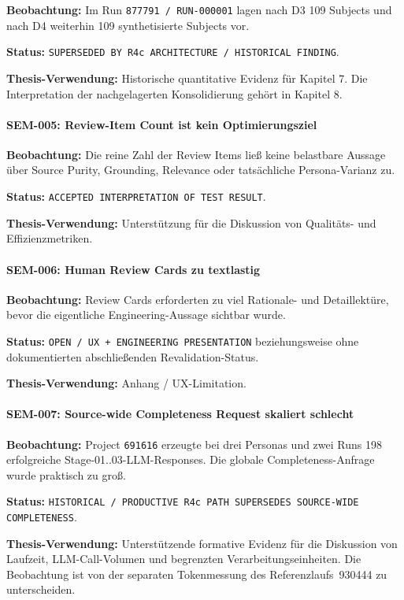 \textbf{Beobachtung:}
Im Run \texttt{877791 / RUN-000001} lagen nach D3 109 Subjects und nach D4
weiterhin 109 synthetisierte Subjects vor.

\textbf{Status:}
\texttt{SUPERSEDED BY R4c ARCHITECTURE / HISTORICAL FINDING}.

\textbf{Thesis-Verwendung:}
Historische quantitative Evidenz für Kapitel 7. Die Interpretation der
nachgelagerten Konsolidierung gehört in Kapitel 8.


\paragraph{SEM-005: Review-Item Count ist kein Optimierungsziel}

\textbf{Beobachtung:}
Die reine Zahl der Review Items ließ keine belastbare Aussage über
Source Purity, Grounding, Relevance oder tatsächliche Persona-Varianz zu.

\textbf{Status:}
\texttt{ACCEPTED INTERPRETATION OF TEST RESULT}.

\textbf{Thesis-Verwendung:}
Unterstützung für die Diskussion von Qualitäts- und Effizienzmetriken.


\paragraph{SEM-006: Human Review Cards zu textlastig}

\textbf{Beobachtung:}
Review Cards erforderten zu viel Rationale- und Detaillektüre, bevor die
eigentliche Engineering-Aussage sichtbar wurde.

\textbf{Status:}
\texttt{OPEN / UX + ENGINEERING PRESENTATION} beziehungsweise ohne dokumentierten
abschließenden Revalidation-Status.

\textbf{Thesis-Verwendung:}
Anhang / UX-Limitation.


\paragraph{SEM-007: Source-wide Completeness Request skaliert schlecht}

\textbf{Beobachtung:}
Project \texttt{691616} erzeugte bei drei Personas und zwei Runs 198 erfolgreiche
Stage-01..03-LLM-Responses. Die globale Completeness-Anfrage wurde praktisch zu groß.

\textbf{Status:}
\texttt{HISTORICAL / PRODUCTIVE R4c PATH SUPERSEDES SOURCE-WIDE COMPLETENESS}.

\textbf{Thesis-Verwendung:}
Unterstützende formative Evidenz für die Diskussion von Laufzeit,
LLM-Call-Volumen und begrenzten Verarbeitungseinheiten. Die Beobachtung ist von der
separaten Tokenmessung des Referenzlaufs~930444 zu unterscheiden.


